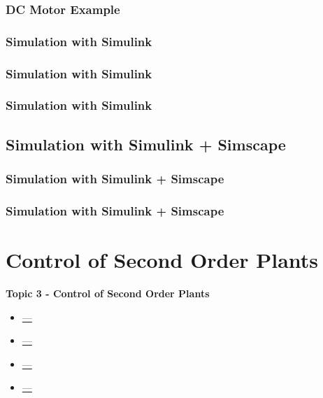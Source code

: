 \documentclass[fleqn]{beamer} %
\newcommand{\sectionIIItitle}{Control of Second Order Plants}
\newcommand{\sectionIIsubsectionIItitle}{DC Motor Example}
\newcommand{\sectionIIsubsectionIIItitle}{Simulation with Simulink}
\newcommand{\sectionIIsubsectionIVtitle}{Simulation with Simulink + Simscape}
\newcommand{\sectionIIIsubsectionItitle}{---}
\newcommand{\sectionIIIsubsectionIItitle}{---}
\newcommand{\sectionIIIsubsectionIIItitle}{---}
\newcommand{\sectionIIIsubsectionIVtitle}{---}
\begin{document}
			\begin{frame}
				\frametitle{\sectionIIsubsectionIItitle}
				\bigskip
								
				\btVFill 
			\end{frame}	


			\begin{frame}
				\frametitle{\sectionIIsubsectionIIItitle}
				\bigskip

				
				\btVFill 
			\end{frame}

			\begin{frame}
				\frametitle{\sectionIIsubsectionIIItitle}
				\bigskip

								
				\btVFill 
			\end{frame}

			\begin{frame}
				\frametitle{\sectionIIsubsectionIIItitle}
				\bigskip

				
				\btVFill 
			\end{frame}

			
		\subsection{\sectionIIsubsectionIVtitle}\label{sectionIIsubsectionIV}

			\begin{frame}[containsverbatim]
				\frametitle{\sectionIIsubsectionIVtitle}
				\bigskip

								
				\btVFill 
			\end{frame}	

			\begin{frame}
				\frametitle{\sectionIIsubsectionIVtitle}
				\bigskip


				\btVFill 
			\end{frame}	
		
	\section{\sectionIIItitle}\label{sectionIII}

		\begin{frame}
			\large \textbf{Topic 3 - \sectionIIItitle} \vspace{3mm}\\

			\begin{itemize}
				\item \hyperlink{sectionIIIsubsectionI}{\sectionIIIsubsectionItitle} \vspc %
				\item \hyperlink{sectionIIIsubsectionII}{\sectionIIIsubsectionIItitle} \vspc %
				\item \hyperlink{sectionIIIsubsectionIII}{\sectionIIIsubsectionIIItitle} \vspc %
				\item \hyperlink{sectionIIIsubsectionIV}{\sectionIIIsubsectionIVtitle} \vspc %
			\end{itemize}

		\end{frame}
\end{document}
